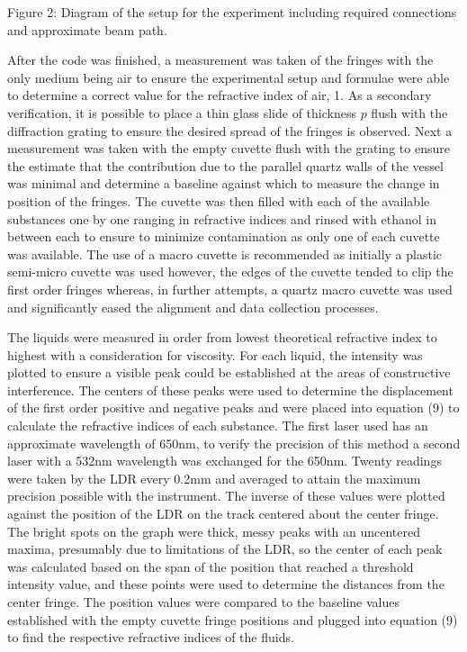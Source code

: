 \documentclass[11pt]{article}
\begin{document}
    Figure 2: Diagram of the setup for the experiment including required
connections and approximate beam path.

    After the code was finished, a measurement was taken of the fringes with
the only medium being air to ensure the experimental setup and formulae
were able to determine a correct value for the refractive index of air,
1. As a secondary verification, it is possible to place a thin glass
slide of thickness \(p\) flush with the diffraction grating to ensure
the desired spread of the fringes is observed. Next a measurement was
taken with the empty cuvette flush with the grating to ensure the
estimate that the contribution due to the parallel quartz walls of the
vessel was minimal and determine a baseline against which to measure the
change in position of the fringes. The cuvette was then filled with each
of the available substances one by one ranging in refractive indices and
rinsed with ethanol in between each to ensure to minimize contamination
as only one of each cuvette was available. The use of a macro cuvette is
recommended as initially a plastic semi-micro cuvette was used however,
the edges of the cuvette tended to clip the first order fringes whereas,
in further attempts, a quartz macro cuvette was used and significantly
eased the alignment and data collection processes.

The liquids were measured in order from lowest theoretical refractive
index to highest with a consideration for viscosity. For each liquid,
the intensity was plotted to ensure a visible peak could be established
at the areas of constructive interference. The centers of these peaks
were used to determine the displacement of the first order positive and
negative peaks and were placed into equation (9) to calculate the
refractive indices of each substance. The first laser used has an
approximate wavelength of 650nm, to verify the precision of this method
a second laser with a 532nm wavelength was exchanged for the 650nm.
Twenty readings were taken by the LDR every 0.2mm and averaged to attain
the maximum precision possible with the instrument. The inverse of these
values were plotted against the position of the LDR on the track
centered about the center fringe. The bright spots on the graph were
thick, messy peaks with an uncentered maxima, presumably due to
limitations of the LDR, so the center of each peak was calculated based
on the span of the position that reached a threshold intensity value,
and these points were used to determine the distances from the center
fringe. The position values were compared to the baseline values
established with the empty cuvette fringe positions and plugged into
equation (9) to find the respective refractive indices of the fluids.
\end{document}
